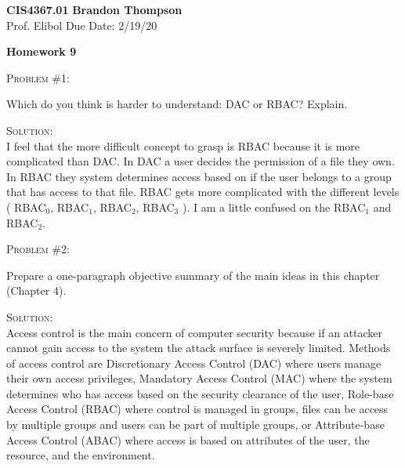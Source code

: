 \documentclass[12pt]{article}
\newenvironment{problem}[1]
{\begin{mdframed}[linewidth=0.8pt]
        \textsc{Problem #1:}

}
    {\end{mdframed}}
\newenvironment{solution}
    {\textsc{Solution:}\\}
    {\newpage}%
\begin{document}
\noindent
\textbf{CIS4367.01} \hfill \textbf{Brandon Thompson} \\
\normalsize Prof. Elibol \hfill Due Date: 2/19/20 \\

\begin{center}
\textbf{Homework 9}
\end{center}
	\begin{problem}{\#1}
		Which do you think is harder to understand: DAC or RBAC? Explain.
	\end{problem}
	\begin{solution}
		I feel that the more difficult concept to grasp is RBAC because it is more 
		complicated than DAC. In DAC a user decides the permission of a file they own.
		In RBAC they system determines access based on if the user belongs to a group
		that has access to that file. RBAC gets more complicated with the different
		levels ( RBAC$_0$, RBAC$_1$, RBAC$_2$, RBAC$_3$ ). I am a little confused on the
		RBAC$_1$ and RBAC$_2$.
	\end{solution}

	\begin{problem}{\#2}
		Prepare a one-paragraph objective summary of the main ideas in this chapter (Chapter 4).
	\end{problem}
	\begin{solution}
		Access control is the main concern of computer security because if an attacker cannot
		gain access to the system the attack surface is severely limited. Methods of access
		control are Discretionary Access Control (DAC) where users manage their own access
		privileges, Mandatory Access Control (MAC) where the system determines who has access
		based on the security clearance of the user, Role-base Access Control (RBAC) where
		control is managed in groups, files can be access by multiple groups and users
		can be part of multiple groups, or Attribute-base Access Control (ABAC) where
		access is based on attributes of the user, the resource, and the environment.
	\end{solution}
\end{document}
